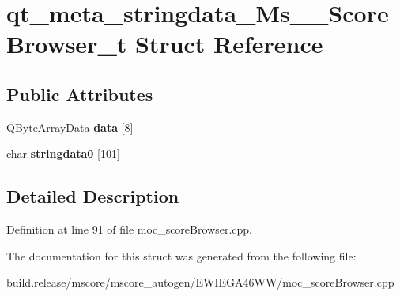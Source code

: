 \hypertarget{structqt__meta__stringdata___ms_____score_browser__t}{}\section{qt\+\_\+meta\+\_\+stringdata\+\_\+\+Ms\+\_\+\+\_\+\+Score\+Browser\+\_\+t Struct Reference}
\label{structqt__meta__stringdata___ms_____score_browser__t}
\subsection*{Public Attributes}
\begin{DoxyCompactItemize}
\item 
\mbox{\label{structqt__meta__stringdata___ms_____score_browser__t_a5ab82ad6ceb1507c9a331361060b665c}} 
Q\+Byte\+Array\+Data {\bfseries data} \mbox{[}8\mbox{]}
\item 
\mbox{\label{structqt__meta__stringdata___ms_____score_browser__t_a930ea3cc9eced1b0ee6565858b99f9df}} 
char {\bfseries stringdata0} \mbox{[}101\mbox{]}
\end{DoxyCompactItemize}


\subsection{Detailed Description}


Definition at line 91 of file moc\+\_\+score\+Browser.\+cpp.



The documentation for this struct was generated from the following file\+:\begin{DoxyCompactItemize}
\item 
build.\+release/mscore/mscore\+\_\+autogen/\+E\+W\+I\+E\+G\+A46\+W\+W/moc\+\_\+score\+Browser.\+cpp\end{DoxyCompactItemize}
